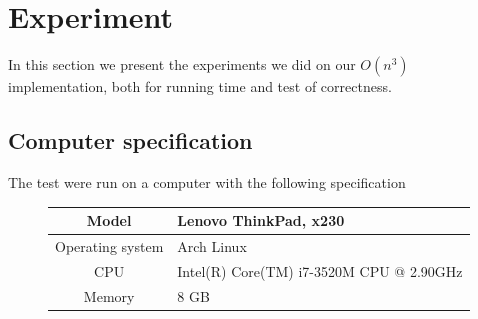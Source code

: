 \section{Experiment}
In this section we present the experiments we did on our $O(n^3)$ implementation,
both for running time and test of correctness.

\subsection{Computer specification}
The test were run on a computer with the following specification
\begin{figure}[H]
\begin{tabular}{| c | l |}
	\hline
	Model & Lenovo ThinkPad, x230 \\
	\hline
	Operating system & Arch Linux \\
	\hline
	CPU & Intel(R) Core(TM) i7-3520M CPU @ 2.90GHz\\
	\hline
	Memory & 8 GB \\
	\hline
\end{tabular}
\end{figure}

